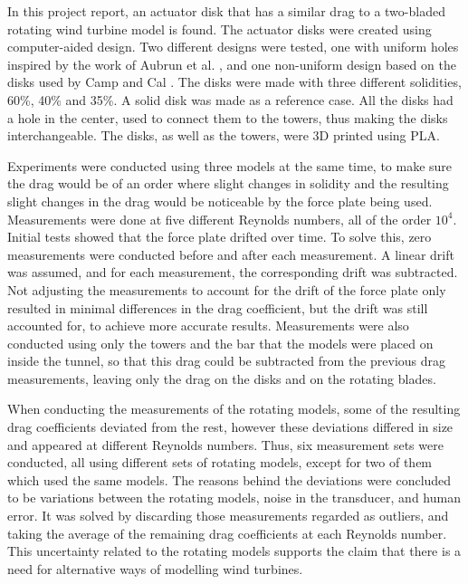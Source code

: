 

In this project report, an actuator disk that has a similar drag to a two-bladed rotating wind turbine model is found. The actuator disks were created using computer-aided design. Two different designs were tested, one with uniform holes inspired by the work of Aubrun et al. \cite{Aubrun2013}, and one non-uniform design based on the disks used by Camp and Cal \cite{Camp2016}. The disks were made with three different solidities, 60\%, 40\% and 35\%. A solid disk was made as a reference case. All the disks had a hole in the center, used to connect them to the towers, thus making the disks interchangeable. The disks, as well as the towers, were 3D printed using PLA. 

Experiments were conducted using three models at the same time, to make sure the drag would be of an order where slight changes in solidity and the resulting slight changes in the drag would be noticeable by the force plate being used. Measurements were done at five different Reynolds numbers, all of the order $10^4$. Initial tests showed that the force plate drifted over time. To solve this, zero measurements were conducted before and after each measurement. A linear drift was assumed, and for each measurement, the corresponding drift was subtracted. Not adjusting the measurements to account for the drift of the force plate only resulted in minimal differences in the drag coefficient, but the drift was still accounted for, to achieve more accurate results. Measurements were also conducted using only the towers and the bar that the models were placed on inside the tunnel, so that this drag could be subtracted from the previous drag measurements, leaving only the drag on the disks and on the rotating blades.  

When conducting the measurements of the rotating models, some of the resulting drag coefficients deviated from the rest, however these deviations differed in size and appeared at different Reynolds numbers. Thus, six measurement sets were conducted, all using different sets of rotating models, except for two of them which used the same models. The reasons behind the deviations were concluded to be variations between the rotating models, noise in the transducer, and human error. It was solved by discarding those measurements regarded as outliers, and taking the average of the remaining drag coefficients at each Reynolds number. This uncertainty related to the rotating models supports the claim that there is a need for alternative ways of modelling wind turbines. 

